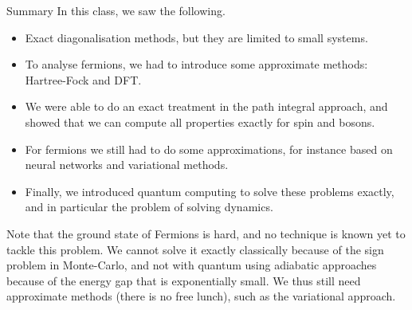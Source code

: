 \documentclass[a4paper]{article}
\begin{document}
\begin{parag}{Summary}
    In this class, we saw the following.
    \begin{itemize}
        \item Exact diagonalisation methods, but they are limited to small systems.
        \item To analyse fermions, we had to introduce some approximate methods: Hartree-Fock and DFT.
        \item We were able to do an exact treatment in the path integral approach, and showed that we can compute all properties exactly for spin and bosons.
        \item For fermions we still had to do some approximations, for instance based on neural networks and variational methods.
        \item Finally, we introduced quantum computing to solve these problems exactly, and in particular the problem of solving dynamics.
    \end{itemize}
    
    Note that the ground state of Fermions is hard, and no technique is known yet to tackle this problem. We cannot solve it exactly classically because of the sign problem in Monte-Carlo, and not with quantum using adiabatic approaches because of the energy gap that is exponentially small. We thus still need approximate methods (there is no free lunch), such as the variational approach.
\end{parag}
\end{document}
